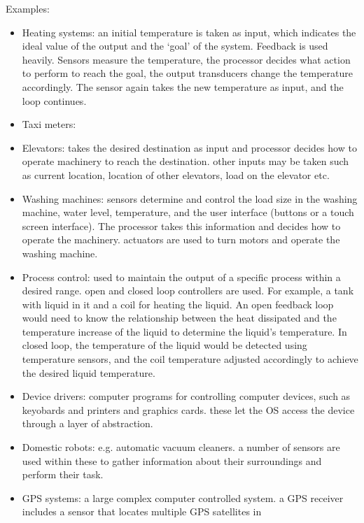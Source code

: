 \documentclass{article}
\begin{document}
Examples:
\begin{itemize}
    \item Heating systems: an initial temperature is taken as input, which 
        indicates the ideal value of the output and the `goal' of the system.
        Feedback is used heavily. Sensors measure the temperature, the
        processor decides what action to perform to reach the goal, the output
        transducers change the temperature accordingly. The sensor again takes
        the new temperature as input, and the loop continues.
    \item Taxi meters:
    \item Elevators: takes the desired destination as input and processor
        decides how to operate machinery to reach the destination. other
        inputs may be taken such as current location, location of other
        elevators, load on the elevator etc.
    \item Washing machines: sensors determine and control the load size in the
        washing machine, water level, temperature, and the user interface
        (buttons or a touch screen interface). The processor takes this
        information and decides how to operate the machinery. actuators are
        used to turn motors and operate the washing machine.
    \item Process control: used to maintain the output of a specific process
        within a desired range. open and closed loop controllers are used. For
        example, a tank with liquid in it and a coil for heating the liquid.
        An open feedback loop would need to know the relationship between the
        heat dissipated and the temperature increase of the liquid to determine
        the liquid's temperature. In closed loop, the temperature of the liquid
        would be detected using temperature sensors, and the coil temperature
        adjusted accordingly to achieve the desired liquid temperature.
    \item Device drivers: computer programs for controlling computer devices,
        such as keyobards and printers and graphics cards. these let the OS
        access the device through a layer of abstraction.
    \item Domestic robots: e.g. automatic vacuum cleaners. a number of sensors
        are used within these to gather information about their surroundings
        and perform their task.
    \item GPS systems: a large complex computer controlled system. a GPS
        receiver includes a sensor that locates multiple GPS satellites in

\end{itemize}
\end{document}
